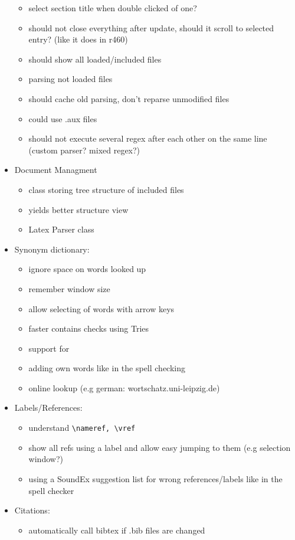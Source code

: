 \documentclass[10pt,a4paper,landscape]{report}
\begin{document}
\begin{itemize}
\begin{itemize}
		\item select section title when double clicked of one?
		\item should not close everything after update, should it scroll to selected entry? (like it does in r460)
		\item should show all loaded/included files
		\item parsing not loaded files
		\item should cache old parsing, don't reparse unmodified files
		\item could use .aux files
		\item should not execute several regex after each other on the same line (custom parser? mixed regex?)	
	\end{itemize}
	\item Document Managment \begin{itemize}
		\item class storing tree structure of included files
		\item yields better structure view
		\item Latex Parser class
	\end{itemize}
	\item Synonym dictionary: \begin{itemize}
		\item ignore space on words looked up
		\item remember window size
		\item allow selecting of words with arrow keys
		\item faster contains checks using Tries
		\item support for 
		\item adding own words like in the spell checking 
		\item online lookup (e.g german: wortschatz.uni-leipzig.de)
	\end{itemize}
	\item Labels/References: \begin{itemize}
		\item understand \verb+\nameref, \vref+
		\item 	show all refs using a label and allow easy jumping to them (e.g selection window?)
		\item using a SoundEx suggestion list for wrong references/labels like in the spell checker
	\end{itemize}
	\item Citations: \begin{itemize}
		\item automatically call bibtex if .bib files are changed

\end{itemize}
\end{itemize}
\end{document}
